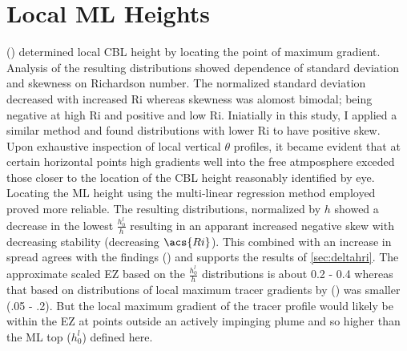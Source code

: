 
\section{Local \acs{ML} Heights}

\citeauthor{SullMoengStev} (\citeyear{SullMoengStev}) determined local \acs{CBL} height by locating the point of maximum gradient.  Analysis of the resulting distributions showed dependence of standard deviation and skewness on Richardson number.  The normalized standard deviation decreased with increased \acs{Ri} whereas skewness was alomost bimodal; being negative at high \acs{Ri} and positive and low \acs{Ri}.  Iniatially in this study, I applied a similar method and found distributions with lower \acs{Ri} to have positive skew.  Upon exhaustive inspection of local vertical $\theta$  profiles, it became evident that at certain horizontal points high gradients well into the free atmposphere exceded those closer to the location of the \acs{CBL} height reasonably identified by eye.\\

Locating the \acs{ML} height using the multi-linear regression method employed proved more reliable.  The resulting distributions, normalized by $h$ showed a decrease in the lowest $\frac{h^{l}_{0}}{h}$ resulting in an apparant increased negative skew with decreasing stability (decreasing $\acs{Ri}$). This combined with an increase in spread agrees with the findings \citeauthor{SullMoengStev} (\citeyear{SullMoengStev}) and supports the results of \ref{sec:deltahri}.  The approximate scaled \acs{EZ} based on the $\frac{h^{l}_{0}}{h}$ distributions is about 0.2 - 0.4 whereas that based on distributions of local maximum tracer gradients by  \citeauthor{BrooksFowler2} (\citeyear{BrooksFowler2}) was smaller (.05 - .2).  But the local maximum gradient of the tracer profile would likely be within the \acs{EZ} at points outside an actively impinging plume and so higher than the \acs{ML} top ($h^{l}_{0}$) defined here. \\  

